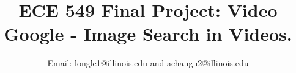 \documentclass[conference]{IEEEtran}
\begin{document}
%
\title{ECE 549 Final Project: Video Google - Image Search in Videos.}


\author{
Email: longle1@illinois.edu and achaugu2@illinois.edu}


% 
\end{document}
